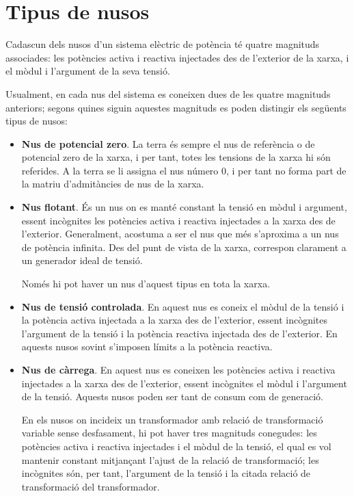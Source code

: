 \section{Tipus de nusos} 

Cadascun dels nusos d'un sistema elèctric de potència té quatre
magnituds associades: les potències activa i reactiva injectades des
de l'exterior de la xarxa, i el mòdul i l'argument de la seva
tensió.

Usualment, en cada nus del sistema es coneixen dues de les quatre
magnituds anteriors; segons quines siguin aquestes magnituds es
poden distingir els següents tipus de nusos:
\begin{itemize}
    \item \textbf{Nus de potencial zero}. La terra és sempre el nus de referència o de potencial zero de la
    xarxa, i per tant, totes les tensions de la xarxa hi són referides.
    A la terra se li assigna el   nus número 0, i per tant no forma part de la matriu d'admitàncies de nus de la xarxa.

   \item \textbf{Nus flotant}. És un nus on es manté constant la tensió en mòdul i argument,
   essent incògnites les potències activa i reactiva injectades a la xarxa des de l'exterior.
    Generalment, acostuma a ser el nus que més s'aproxima a un nus de potència infinita. Des del
    punt de vista de la xarxa, correspon clarament a un generador ideal de tensió.

Només hi pot haver un nus d'aquest tipus en tota la xarxa.
   \item \textbf{Nus de tensió controlada}. En aquest nus es coneix el mòdul de la tensió i la
   potència activa injectada a la xarxa des de l'exterior, essent incògnites l'argument de la tensió i la potència
   reactiva injectada des de l'exterior. En aquests nusos sovint s'imposen límits a la potència reactiva.

   \item \textbf{Nus de càrrega}. En aquest nus es coneixen les potències activa i reactiva
   injectades a la xarxa des de l'exterior, essent incògnites el mòdul i l'argument de la tensió.
   Aquests nusos poden ser tant de consum com de generació.

En els nusos on incideix un transformador amb relació de
transformació variable sense desfasament, hi pot haver tres magnituds
conegudes: les potències activa i reactiva injectades i el mòdul de
la tensió, el qual es vol mantenir constant mitjançant l'ajust de la
relació de transformació; les incògnites són, per tant, l'argument de
la tensió i la citada relació de transformació del transformador.
\end{itemize}

